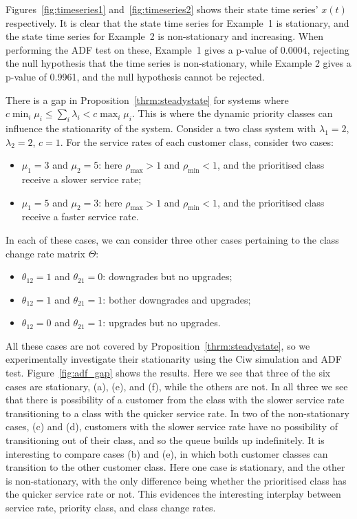 \documentclass{article}
\begin{document}
Figures~\ref{fig:timeseries1} and~\ref{fig:timeseries2} shows their state time
series' $x(t)$ respectively. It is clear that the state time series for
Example~1 is stationary, and the state time series for Example~2 is
non-stationary and increasing. When performing the ADF test on these, Example~1
gives a p-value of 0.0004, rejecting the null hypothesis that the time series is
non-stationary, while Example 2 gives a p-value of 0.9961, and the null
hypothesis cannot be rejected.

There is a gap in Proposition~\ref{thrm:steadystate} for systems where
$c \min_i \mu_i \leq \sum_i \lambda_i < c \max_i \mu_i$. This is where the
dynamic priority classes can influence the stationarity of the system. Consider
a two class system with $\lambda_1 = 2$, $\lambda_2 = 2$, $c = 1$. For the
service rates of each customer class, consider two cases:

\begin{itemize}
  \item $\mu_1 = 3$ and $\mu_2 = 5$: here $\rho_{\text{max}} > 1$ and
  $\rho_{\text{min}} < 1$, and the prioritised class receive a slower
  service rate;
  \item $\mu_1 = 5$ and $\mu_2 = 3$: here $\rho_{\text{max}} > 1$ and
  $\rho_{\text{min}} < 1$, and the prioritised class receive a faster
  service rate.
\end{itemize}

In each of these cases, we can consider three other cases pertaining to the
class change rate matrix $\Theta$:

\begin{itemize}
  \item $\theta_{12} = 1$ and $\theta_{21} = 0$: downgrades but no upgrades;
  \item $\theta_{12} = 1$ and $\theta_{21} = 1$: bother downgrades and upgrades;
  \item $\theta_{12} = 0$ and $\theta_{21} = 1$: upgrades but no upgrades.
\end{itemize}

All these cases are not covered by Proposition~\ref{thrm:steadystate}, so we
experimentally investigate their stationarity using the Ciw simulation and ADF
test. Figure~\ref{fig:adf_gap} shows the results. Here we see that three of the
six cases are stationary, (a), (e), and (f), while the others are not. In all
three we see that there is possibility of a customer from the class with the
slower service rate transitioning to a class with the quicker service rate. In
two of the non-stationary cases, (c) and (d), customers with the slower service
rate have no possibility of transitioning out of their class, and so the queue
builds up indefinitely.
It is interesting to compare cases (b) and (e), in which both customer classes
can transition to the other customer class. Here one case is stationary, and the
other is non-stationary, with the only difference being whether the prioritised
class has the quicker service rate or not. This evidences the interesting
interplay between service rate, priority class, and class change rates.
\end{document}

